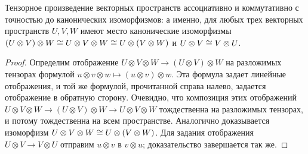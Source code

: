 \begin{proposition}\label{prop:tensor_assoc_and_comm}
Тензорное произведение векторных пространств ассоциативно и
коммутативно с точностью
до канонических изоморфизмов: а именно, для любых трех векторных
пространств $U,V,W$ имеют место канонические изоморфизмы
$(U\otimes V)\otimes W \cong U\otimes V\otimes W \cong U\otimes
(V\otimes W)$ и $U\otimes V \cong V\otimes U$.
\end{proposition}
\begin{proof}
Определим отображение
$U\otimes V\otimes W\to (U\otimes V)\otimes W$
на разложимых тензорах формулой
$u\otimes v\otimes w\mapsto (u\otimes v)\otimes w$.
Эта формула задает линейные отображения, и той же формулой,
прочитанной справа налево, задается отображение в обратную
сторону. Очевидно, что композиция этих отображений
$U\otimes V\otimes W\to (U\otimes V)\otimes W\to
U\otimes V\otimes W$ тождественна на
разложимых тензорах, и потому тождественна на всем пространстве.
Аналогично доказывается изоморфизм
$U\otimes V\otimes W\cong U\otimes (V\otimes W)$.
Для задания отображения $U\otimes V\to V\otimes U$ отправим
$u\otimes v$ в $v\otimes u$; доказательство завершается так же.
\end{proof}

